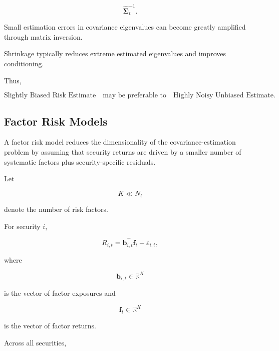 \documentclass[11pt,a4paper]{article}
\begin{document}
\begin{equation}
\widehat{\boldsymbol{\Sigma}}_t^{-1}.
\end{equation}

Small estimation errors in covariance eigenvalues can become greatly amplified
through matrix inversion.

Shrinkage typically reduces extreme estimated eigenvalues and improves
conditioning.

Thus,

\begin{equation}
\boxed{
\text{Slightly Biased Risk Estimate}
\quad\text{may be preferable to}\quad
\text{Highly Noisy Unbiased Estimate}.
}
\end{equation}


\subsection{Factor Risk Models}
\label{subsec:factor_risk_models}

A factor risk model reduces the dimensionality of the covariance-estimation
problem by assuming that security returns are driven by a smaller number of
systematic factors plus security-specific residuals.

Let

\begin{equation}
K
\ll
N_t
\end{equation}

denote the number of risk factors.

For security $i$,

\begin{equation}
\boxed{
R_{i,t}
=
\mathbf{b}_{i,t}^{\top}
\mathbf{f}_t
+
\varepsilon_{i,t},
}
\end{equation}

where

\begin{equation}
\mathbf{b}_{i,t}
\in
\mathbb{R}^{K}
\end{equation}

is the vector of factor exposures and

\begin{equation}
\mathbf{f}_t
\in
\mathbb{R}^{K}
\end{equation}

is the vector of factor returns.

Across all securities,
\end{document}
